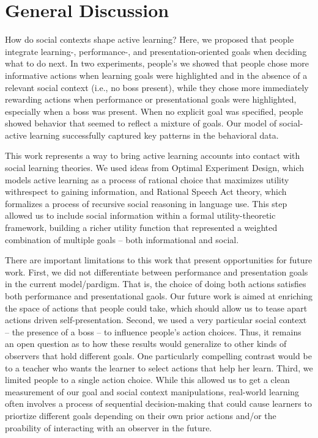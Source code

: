 \documentclass[10pt, letterpaper]{article}
\begin{document}
\section{General Discussion}\label{general-discussion}

How do social contexts shape active learning? Here, we proposed that
people integrate learning-, performance-, and presentation-oriented
goals when deciding what to do next. In two experiments, people's we
showed that people chose more informative actions when learning goals
were highlighted and in the absence of a relevant social context (i.e.,
no boss present), while they chose more immediately rewarding actions
when performance or presentational goals were highlighted, especially
when a boss was present. When no explicit goal was specified, people
showed behavior that seemed to reflect a mixture of goals. Our model of
social-active learning successfully captured key patterns in the
behavioral data.

This work represents a way to bring active learning accounts into
contact with social learning theories. We used ideas from Optimal
Experiment Design, which models active learning as a process of rational
choice that maximizes utility withrespect to gaining information, and
Rational Speech Act theory, which formalizes a process of recursive
social reasoning in language use. This step allowed us to include social
information within a formal utility-theoretic framework, building a
richer utility function that represented a weighted combination of
multiple goals -- both informational and social.

There are important limitations to this work that present opportunities
for future work. First, we did not differentiate between performance and
presentation goals in the current model/pardigm. That is, the choice of
doing both actions satisfies both performance and presentational gaols.
Our future work is aimed at enriching the space of actions that people
could take, which should allow us to tease apart actions driven
self-presentation. Second, we used a very particular social context --
the presence of a boss -- to influence people's action choices. Thus, it
remains an open question as to how these results would generalize to
other kinds of observers that hold different goals. One particularly
compelling contrast would be to a teacher who wants the learner to
select actions that help her learn. Third, we limited people to a single
action choice. While this allowed us to get a clean measurement of our
goal and social context manipulations, real-world learning often
involves a process of sequential decision-making that could cause
learners to priortize different goals depending on their own prior
actions and/or the proability of interacting with an observer in the
future.
\end{document}
